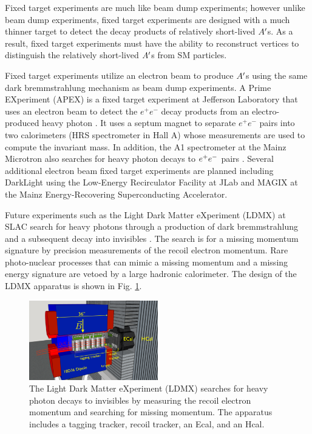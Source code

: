 Fixed target experiments are much like beam dump experiments; however unlike beam dump experiments, fixed target experiments are designed with a much thinner target to detect the decay products of relatively short-lived $A^\prime$s. As a result, fixed target experiments must have the ability to reconstruct vertices to distinguish the relatively short-lived $A^\prime$s from SM particles. %

Fixed target experiments utilize an electron beam to produce $A^\prime$s using the same dark bremmstrahlung mechanism as beam dump experiments. A Prime EXperiment (APEX) is a fixed target experiment at Jefferson Laboratory that uses an electron beam to detect the $e^+e^-$ decay products from an electro-produced heavy photon \cite{Essig:2010xa} \cite{Abrahamyan:2011gv}. It uses a septum magnet to separate $e^+e^-$ pairs into two calorimeters (HRS spectrometer in Hall A) whose measurements are used to compute the invariant mass. In addition, the A1 spectrometer at the Mainz Microtron also searches for heavy photon decays to $e^{+}e^{-}$ pairs \cite{Merkel:2014avp}. Several additional electron beam fixed target experiments are planned including DarkLight using the Low-Energy Recirculator Facility at JLab and MAGIX at the Mainz Energy-Recovering Superconducting Accelerator.

Future experiments such as the Light Dark Matter eXperiment (LDMX) at SLAC search for heavy photons through a production of dark bremmstrahlung and a subsequent decay into invisibles \cite{kesson2018light}. The search is for a missing momentum signature by precision measurements of the recoil electron momentum. Rare photo-nuclear processes that can mimic a missing momentum and a missing energy signature are vetoed by a large hadronic calorimeter. The design of the LDMX apparatus is shown in Fig. \ref{fig:ldmx}.

 \begin{figure}[!h]
    \centering
    \includegraphics[width=0.5\textwidth]{figs/motivation/ldmx.png}
    \caption{The Light Dark Matter eXperiment (LDMX) searches for heavy photon decays to invisibles by measuring the recoil electron momentum and searching for missing momentum. The apparatus includes a tagging tracker, recoil tracker, an Ecal, and an Hcal.}
    \label{fig:ldmx}
\end{figure}

